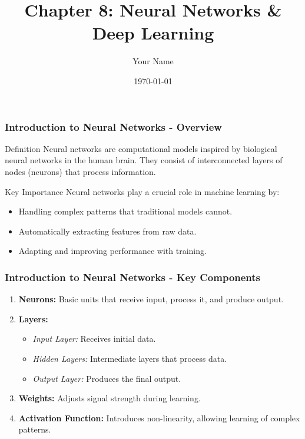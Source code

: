 \documentclass{beamer}
\title{Chapter 8: Neural Networks \& Deep Learning}
\author{Your Name}
\institute{Your Institution}
\date{\today}
\begin{document}
\frame{\titlepage}

\begin{frame}[fragile]
    \frametitle{Introduction to Neural Networks - Overview}
    \begin{block}{Definition}
        Neural networks are computational models inspired by biological neural networks in the human brain. They consist of interconnected layers of nodes (neurons) that process information.
    \end{block}
    \begin{block}{Key Importance}
        Neural networks play a crucial role in machine learning by:
        \begin{itemize}
            \item Handling complex patterns that traditional models cannot.
            \item Automatically extracting features from raw data.
            \item Adapting and improving performance with training.
        \end{itemize}
    \end{block}
\end{frame}

\begin{frame}[fragile]
    \frametitle{Introduction to Neural Networks - Key Components}
    \begin{enumerate}
        \item \textbf{Neurons:} Basic units that receive input, process it, and produce output.
        \item \textbf{Layers:}
          \begin{itemize}
              \item \textit{Input Layer:} Receives initial data.
              \item \textit{Hidden Layers:} Intermediate layers that process data.
              \item \textit{Output Layer:} Produces the final output.
          \end{itemize}
        \item \textbf{Weights:} Adjusts signal strength during learning.
        \item \textbf{Activation Function:} Introduces non-linearity, allowing learning of complex patterns.
    \end{enumerate}
\end{frame}
\end{document}
